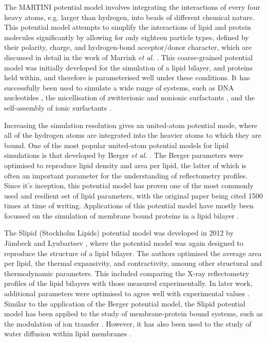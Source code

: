 The MARTINI potential model involves integrating the interactions of every four heavy atoms, e.g. larger than hydrogen, into beads of different chemical nature.
This potential model attempts to simplify the interactions of lipid and protein molecules significantly by allowing for only eighteen particle types, defined by their polarity, charge, and hydrogen-bond acceptor/donor character, which are discussed in detail in the work of Marrink \emph{et al.} \cite{marrink_martini_2007}.
This coarse-grained potential model was initially developed for the simulation of a lipid bilayer, and proteins held within, and therefore is parameterised well under these conditions.
It has successfully been used to simulate a wide range of systems, such as DNA nucleotides \cite{uusitalo_martini_2015}, the micellisation of zwitterionic and nonionic surfactants \cite{sanders_micellization_2010}, and the self-assembly of ionic surfactants \cite{wang_coarse-grained_2015}.

Increasing the simulation resolution gives an united-atom potential mode, where all of the hydrogen atoms are integrated into the heavier atoms to which they are bound.
One of the most popular united-atom potential models for lipid simulations is that developed by Berger \emph{et al.} \cite{berger_molecular_1997}.
The Berger parameters were optimised to reproduce lipid density and area per lipid, the latter of which is often an important parameter for the understanding of reflectometry profiles.
Since it's inception, this potential model has proven one of the most commonly used and resilient set of lipid parameters, with the original paper being cited 1500 times at time of writing.
Applications of this potential model have mostly been focussed on the simulation of membrane bound proteins in a lipid bilayer \cite{tieleman_membrane_2006,cordomi_membrane_2012}.

The Slipid (Stockholm Lipids) potential model was developed in 2012 by J\"{a}mbeck and Lyubartsev \cite{jambeck_derivation_2012}, where the potential model was again designed to reproduce the structure of a lipid bilayer.
The authors optimised the average area per lipid, the thermal expansivity, and contractivity, amoung other structural and thermodynamic parameters.
This included comparing the X-ray reflectometry profiles of the lipid bilayers with those measured experimentally.
In later work, additional parameters were optimised to agree well with experimental values \cite{jambeck_extension_2012,jambeck_another_2013}.
Similar to the application of the Berger potential model, the Slipid potential model has been applied to the study of membrane-protein bound systems, such as the modulation of ion transfer \cite{segala_controlling_2016}.
However, it has also been used to the study of water diffusion within lipid membranes \cite{von_hansen_anomalous_2013}.

